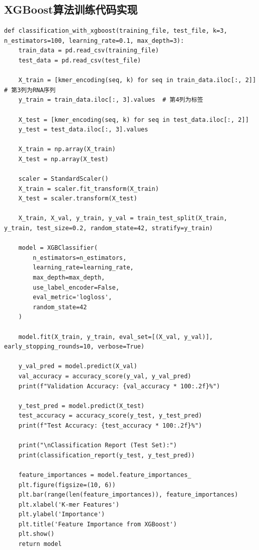 \documentclass[a4paper,11pt,AutoFakeBold]{ctexart}
\begin{document}
\subsection{XGBoost算法训练代码实现}
\begin{lstlisting}
def classification_with_xgboost(training_file, test_file, k=3, n_estimators=100, learning_rate=0.1, max_depth=3):
    train_data = pd.read_csv(training_file)
    test_data = pd.read_csv(test_file)

    X_train = [kmer_encoding(seq, k) for seq in train_data.iloc[:, 2]]  # 第3列为RNA序列
    y_train = train_data.iloc[:, 3].values  # 第4列为标签
    
    X_test = [kmer_encoding(seq, k) for seq in test_data.iloc[:, 2]]
    y_test = test_data.iloc[:, 3].values

    X_train = np.array(X_train)
    X_test = np.array(X_test)

    scaler = StandardScaler()
    X_train = scaler.fit_transform(X_train)
    X_test = scaler.transform(X_test)

    X_train, X_val, y_train, y_val = train_test_split(X_train, y_train, test_size=0.2, random_state=42, stratify=y_train)

    model = XGBClassifier(
        n_estimators=n_estimators,
        learning_rate=learning_rate,
        max_depth=max_depth,
        use_label_encoder=False,
        eval_metric='logloss',
        random_state=42
    )

    model.fit(X_train, y_train, eval_set=[(X_val, y_val)], early_stopping_rounds=10, verbose=True)

    y_val_pred = model.predict(X_val)
    val_accuracy = accuracy_score(y_val, y_val_pred)
    print(f"Validation Accuracy: {val_accuracy * 100:.2f}%")

    y_test_pred = model.predict(X_test)
    test_accuracy = accuracy_score(y_test, y_test_pred)
    print(f"Test Accuracy: {test_accuracy * 100:.2f}%")

    print("\nClassification Report (Test Set):")
    print(classification_report(y_test, y_test_pred))

    feature_importances = model.feature_importances_
    plt.figure(figsize=(10, 6))
    plt.bar(range(len(feature_importances)), feature_importances)
    plt.xlabel('K-mer Features')
    plt.ylabel('Importance')
    plt.title('Feature Importance from XGBoost')
    plt.show()
    return model
\end{lstlisting}
\end{document}
